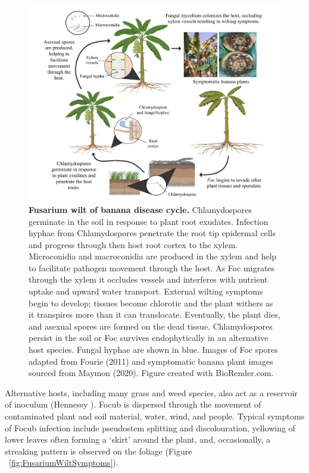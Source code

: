 \begin{figure}[hp!]
    \centering
    \includegraphics[width=14cm]{Figures/MyLifeCylceNarrow.pdf}
    \caption[Fusarium wilt of banana disease cycle.]{\textbf{Fusarium wilt of banana disease cycle.} Chlamydospores germinate in the soil in response to plant root exudates. Infection hyphae from Chlamydospores penetrate the root tip epidermal cells and progress through then host root cortex to the xylem. Microconidia and macroconidia are produced in the xylem and help to facilitate pathogen movement through the host. As Foc migrates through the xylem it occludes vessels and interferes with nutrient uptake and upward water transport. External wilting symptoms begin to develop; tissues become chlorotic and the plant withers as it transpires more than it can translocate. Eventually, the plant dies, and asexual spores are formed on the dead tissue. Chlamydospores persist in the soil or Foc survives endophytically in an alternative host species. Fungal hyphae are shown in blue. Images of Foc spores adapted from Fourie \et  (2011) and symptomatic banana plant images sourced from Maymon \et  (2020). Figure created with BioRender.com.}
    \label{fig:MyLifeCylce.}
\end{figure}


Alternative hosts, including many grass and weed species, also act as a reservoir of inoculum (Hennessy ).  \ac{Focub} is dispersed through the movement of contaminated plant and soil material, water, wind, and people. Typical symptoms of \ac{Focub} infection include pseudostem splitting and discolouration, yellowing of lower leaves often forming a ‘skirt’ around the plant, and, occasionally, a streaking pattern is observed on the foliage (Figure ~\ref{fig:FusariumWiltSymptoms}). 

